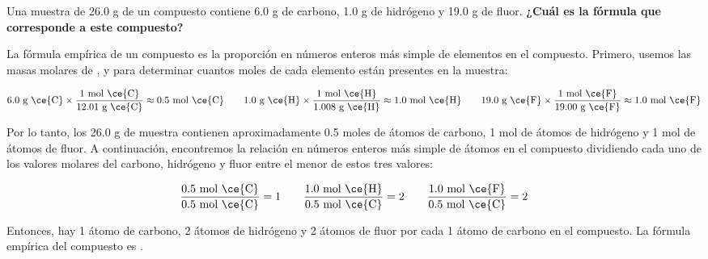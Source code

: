 Una muestra de 26.0 g de un compuesto contiene 6.0 g de carbono, 1.0 g de hidrógeno y 19.0 g de fluor.
\textbf{¿Cuál es la fórmula que corresponde a este compuesto?}

\begin{oneparchoices}
    \choice  {}
    \choice  {}
    \CorrectChoice  {}
    \choice  {}
\end{oneparchoices}

\begin{solutionbox}{7.5cm}
    La fórmula empírica de un compuesto es la proporción en números enteros más simple de elementos en el compuesto.
    Primero, usemos las masas molares de ,  y  para determinar cuantos moles de cada elemento están presentes en la muestra:

    \[ 6.0 \text{ g \ce{C}} \times \frac{1 \text{ mol \ce{C}}}{12.01 \text{ g \ce{C}}} \approx 0.5 \text{ mol \ce{C}}  \qquad 1.0 \text{ g \ce{H}} \times \frac{1 \text{ mol \ce{H}}}{1.008 \text{ g \ce{H}}} \approx 1.0 \text{ mol \ce{H}}  \qquad  19.0 \text{ g \ce{F}} \times \frac{1 \text{ mol \ce{F}}}{19.00 \text{ g \ce{F}}} \approx 1.0 \text{ mol \ce{F}} \]

    Por lo tanto, los 26.0 g de muestra contienen aproximadamente 0.5 moles de átomos de carbono, 1 mol de átomos de hidrógeno y 1 mol de átomos de fluor.
    A continuación, encontremos la relación en números enteros más simple de átomos en el compuesto dividiendo cada uno de los valores molares del carbono, hidrógeno y fluor entre el menor de estos tres valores:

    \[ \frac{0.5 \text{ mol \ce{C}}}{0.5 \text{ mol \ce{C}}} = 1 \qquad \frac{1.0 \text{ mol \ce{H}}}{0.5 \text{ mol \ce{C}}} = 2 \qquad \frac{1.0 \text{ mol \ce{F}}}{0.5 \text{ mol \ce{C}}} = 2 \]

    Entonces, hay 1 átomo de carbono, 2 átomos de hidrógeno y 2 átomos de fluor por cada 1 átomo de carbono en el compuesto.
    La fórmula empírica del compuesto es .
\end{solutionbox}